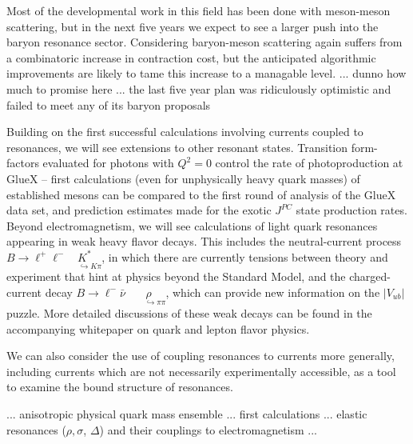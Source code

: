 {Most of the developmental work in this field has been done with meson-meson scattering, but in the next five years we expect to see a larger push into the baryon resonance sector. Considering baryon-meson scattering again suffers from a combinatoric increase in contraction cost, but the anticipated algorithmic improvements are likely to tame this increase to a managable level.
... {\color{red} dunno how much to promise here ... the last five year plan was ridiculously optimistic and failed to meet any of its baryon proposals}

Building on the first successful calculations involving currents coupled to resonances, we will see extensions to other resonant states. Transition form-factors evaluated for photons with $Q^2=0$ control the rate of photoproduction at GlueX -- first calculations (even for unphysically heavy quark masses) of established mesons can be compared to the first round of analysis of the GlueX data set, and prediction estimates made for the exotic $J^{PC}$ state production rates. Beyond electromagnetism, we will see calculations of light quark resonances appearing in weak heavy flavor decays. This includes the neutral-current process $B \to \ell^+\ell^- \!\!\!\! \underset{\;\;\;\;\;\hookrightarrow K\pi}{K^*}$, in which there are currently tensions between theory and experiment that hint at physics beyond the Standard Model, and the charged-current decay $B \to \ell^-\bar{\nu}  \!\!\!\!\!\!\!\!\;\;\underset{\;\;\;\;\;\;\hookrightarrow \pi\pi}{\rho}$, which can provide new information on the $|V_{ub}|$ puzzle. More detailed discussions of these weak decays can be found in
the accompanying whitepaper on quark and lepton flavor physics.

We can also consider the use of coupling resonances to currents more generally, including currents which are not necessarily experimentally accessible, as a tool to examine the bound structure of resonances. 






... anisotropic physical quark mass ensemble ... first calculations ... elastic resonances ($\rho, \sigma$, $\Delta$) and their couplings to electromagnetism ... 

}




















